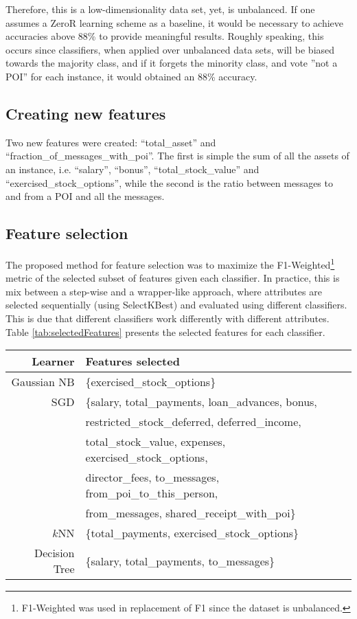 \documentclass[11pt]{article}
\begin{document}
		Therefore, this is a low-dimensionality data set, yet, is unbalanced.
		If one assumes a ZeroR learning scheme as a baseline, it would be necessary to achieve accuracies above 88\% to provide meaningful results.
		Roughly speaking, this occurs since classifiers, when applied over unbalanced data sets, will be biased towards the majority class, and if it forgets the minority class, and vote ''not a POI'' for each instance, it would obtained an 88\% accuracy.
	
	
	\subsection{Creating new features}
		Two new features were created: ``total\_asset'' and ``fraction\_of\_messages\_with\_poi''.
		The first is simple the sum of all the assets of an instance, i.e. ``salary'', ``bonus'', ``total\_stock\_value'' and ``exercised\_stock\_options'', while the second is the ratio between messages to and from a POI and all the messages.
	
	
	
	\subsection{Feature selection}
		The proposed method for feature selection was to maximize the F1-Weighted\footnote{F1-Weighted was used in replacement of F1 since the dataset is unbalanced.} metric of the selected subset of features given each classifier.
		In practice, this is mix between a step-wise and a wrapper-like approach, where attributes are selected sequentially (using SelectKBest) and evaluated using different classifiers.
		This is due that different classifiers work differently with different attributes.
		Table \ref{tab:selectedFeatures} presents the selected features for each classifier.

		\begin{table*}[!t]
			\centering
			\caption{Features selected for usage in each classifier.}
			\begin{tabular}{rl}
				\hline
				Learner & Features selected\\
				\hline
				Gaussian NB & \{exercised\_stock\_options\}\\
				SGD & \{salary, total\_payments, loan\_advances, bonus,\\
				~   & restricted\_stock\_deferred, deferred\_income,\\ 
				~   & total\_stock\_value, expenses, exercised\_stock\_options, \\
				~   & director\_fees, to\_messages, from\_poi\_to\_this\_person, \\
				~   & from\_messages, shared\_receipt\_with\_poi\}\\
				$k$NN & \{total\_payments, exercised\_stock\_options\}\\
				Decision Tree & \{salary, total\_payments, to\_messages\}\\
				\hline
			\end{tabular}
			\label{tab:selectedFeatures}
		\end{table*}
			
\end{document}
